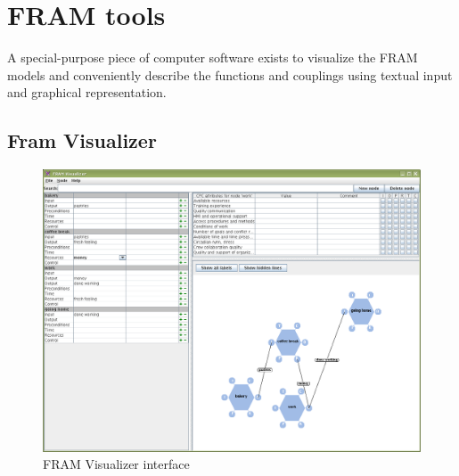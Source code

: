 \section{FRAM tools}
A special-purpose piece of computer software exists to visualize the FRAM models and conveniently describe the functions and couplings using textual input and graphical representation.


\subsection{Fram Visualizer}


\begin{figure}
 \centering
   \includegraphics[width=320pt]{figures/framvisualizer1.png}
 \caption{FRAM Visualizer interface}
 \label{fig:fram_visualizer_interface}
\end{figure}


